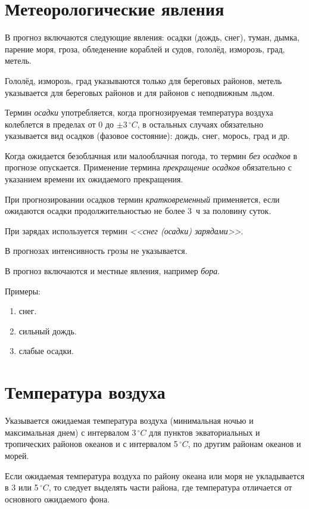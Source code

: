 \documentclass[a4paper, 12pt, twoside, final, book, russian, fittopage, cyremdash, openright]{ncc}
\newcommand{\grC}{\ensuremath{\,^\circ{}C}\xspace}
\begin{document}
\section{Метеорологические явления}
\label{sec:meteo_phenom}

В прогноз включаются следующие явления: осадки (дождь, снег), туман,
дымка, парение моря, гроза, обледенение кораблей и судов, гололёд,
изморозь, град, метель.

Гололёд, изморозь, град указываются только для береговых районов,
метель указывается для береговых районов и для районов с неподвижным
льдом.

Термин \textit{осадки} употребляется, когда прогнозируемая температура
воздуха колеблется в пределах от 0 до $\pm3\grC$, в остальных случаях
обязательно указывается вид осадков (фазовое состояние): дождь, снег,
морось, град и др.

Когда ожидается безоблачная или малооблачная погода, то термин
\textit{без осадков} в прогнозе опускается. Применение термина
\textit{прекращение осадков} обязательно с указанием времени их
ожидаемого прекращения.

При прогнозировании осадков термин \textit{кратковременный}
применяется, если ожидаются осадки продолжительностью не более 3~ч за
половину суток.

При зарядах используется термин \textit{<<снег (осадки) зарядами>>}.

В прогнозах интенсивность грозы не указывается.

В прогноз включаются и местные явления, например \textit{бора}.

Примеры:
\begin{enumerate}[label={}]
\item {} снег.
\item {} сильный дождь.
\item {} слабые осадки.
\end{enumerate}

\section{Температура воздуха}
\label{sec:temp}

Указывается ожидаемая температура воздуха (минимальная ночью и
максимальная днем) с интервалом 3\grC для пунктов экваториальных и
тропических районов океанов и с интервалом 5\grC, по другим районам
океанов и морей.

Если ожидаемая температура воздуха по району океана или моря не
укладывается в 3 или 5\grC, то следует выделять части района, где
температура отличается от основного ожидаемого фона.
\end{document}

